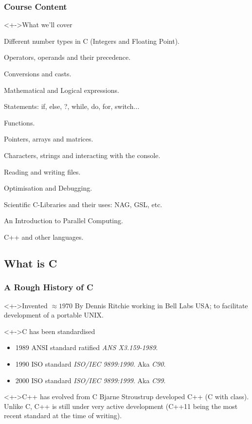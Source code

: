 \documentclass[smaller,handout,table]{beamer}
\begin{document}
\begin{frame}
\frametitle{Course Content}
\begin{block}<+->{What we'll cover}
\begin{itemize}
\begin{small}
\item Different number types in C (Integers and Floating Point).
\item Operators, operands and their precedence.
\item Conversions and casts.
\item Mathematical and Logical expressions.
\item Statements: if, else, ?, while, do, for, switch$\ldots$
\item Functions.
\item Pointers, arrays and matrices.
\item Characters, strings and interacting with the console.
\item Reading and writing files.
\item Optimisation and Debugging.
\item Scientific C-Libraries and their uses: NAG, GSL, etc.
\item An Introduction to Parallel Computing.
\item C++ and other languages.
\end{small}
\end{itemize}
\end{block}
\end{frame}

\subsection{What is C}
\begin{frame}
\frametitle{A Rough History of C}
\begin{block}<+->{Invented $\approx{1970}$}
By Dennis Ritchie working in Bell Labs USA; to facilitate development of
a portable UNIX.
\end{block}
\begin{block}<+->{C has been standardised}
\begin{itemize}
\item 1989 ANSI standard ratified \emph{ANS X3.159-1989}.
\item 1990 ISO standard \emph{ISO/IEC 9899:1990}. Aka \emph{C90}.
\item 2000 ISO standard \emph{ISO/IEC 9899:1999}. Aka \emph{C99}.
\end{itemize}
\end{block}
\begin{block}<+->{C++ has evolved from C}
Bjarne Stroustrup developed C++ (C with class). Unlike C, C++ is still under
very active development (C++11 being the most recent standard at the time of
writing).
\end{block}
\end{frame}
\end{document}
